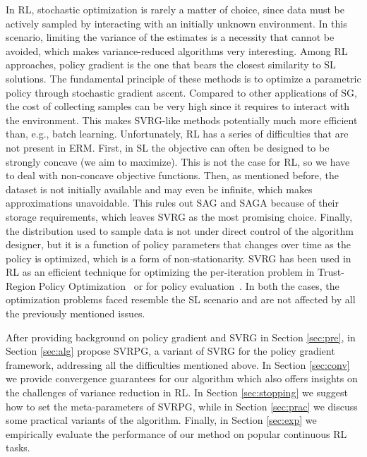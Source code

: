 \documentclass{article}
\makeatletter
\theoremstyle{remark}
\theoremstyle{definition}
\DeclareRobustCommand{\eg}{e.g.,\@\xspace}
\DeclareRobustCommand{\wrt}{w.r.t.\@\xspace}
\makeatother
\begin{document}
In RL, stochastic optimization is rarely a matter of choice, since data must be actively sampled by interacting with an initially unknown environment. In this scenario, limiting the variance of the estimates is a necessity that cannot be avoided, which makes variance-reduced algorithms very interesting.
Among RL approaches, policy gradient \cite{sutton2000policy} is the one that bears the closest similarity to SL solutions. The fundamental principle of these methods is to optimize a parametric policy through stochastic gradient ascent. Compared to other applications of SG, the cost of collecting samples can be very high since it requires to interact with the environment. This makes SVRG-like methods potentially much more efficient than, \eg batch learning.
Unfortunately, RL has a series of difficulties that are not present in ERM. First, in SL the objective can often be designed to be strongly concave (we aim to maximize). This is not the case for RL, so we have to deal with non-concave objective functions. Then, as mentioned before, the dataset is not initially available and may even be infinite, which makes approximations unavoidable. This rules out SAG and SAGA because of their storage requirements, which leaves SVRG as the most promising choice. Finally, the distribution used to sample data is not under direct control of the algorithm designer, but it is a function of policy parameters that changes over time as the policy is optimized, which is a form of non-stationarity.
SVRG has been used in RL as an efficient technique for optimizing the per-iteration problem in Trust-Region Policy Optimization~\citep{xu2017svrgtrpo} or for policy evaluation~\citep{du2017svrgpe}.
In both the cases, the optimization problems faced resemble the SL scenario and are not affected by all the previously mentioned issues.

After providing background on policy gradient and SVRG in Section \ref{sec:pre}, in Section \ref{sec:alg} propose SVRPG, a variant of SVRG for the policy gradient framework, addressing all the difficulties mentioned above. In Section \ref{sec:conv} we provide convergence guarantees for our algorithm which also offers insights on the challenges of variance reduction in RL. In Section \ref{sec:stopping} we suggest how to set the meta-parameters of SVRPG, while in Section \ref{sec:prac} we discuss some practical variants of the algorithm. Finally, in Section \ref{sec:exp} we empirically evaluate the performance of our method on popular continuous RL tasks.
\end{document}
